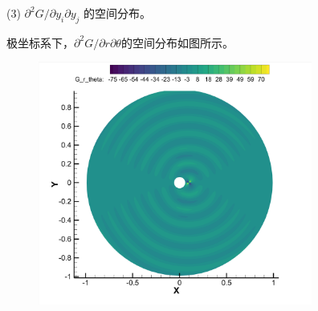 \begin{enumerate}
    \clearpage

    (3) \(\partial^{2} G / \partial y_{i} \partial y_{j}\) 的空间分布。
    
    极坐标系下，\(\partial^{2} G / \partial r \partial \theta \)的空间分布如图所示。
    \begin{figure}[htbp]
        \centering
        \includegraphics[height=8cm]{image/G_r_theta.png}
    \end{figure}
\end{enumerate}

\clearpage